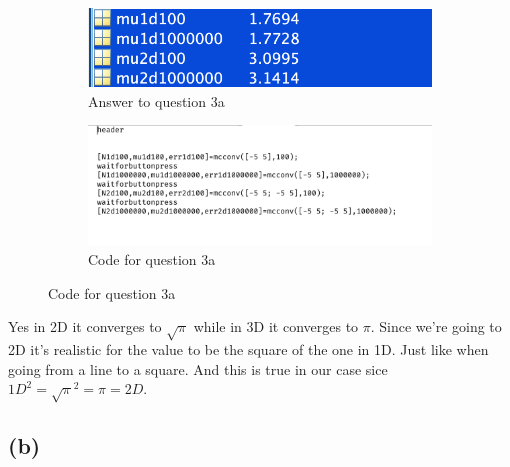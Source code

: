 \documentclass{article}
\begin{document}
\begin{figure}[H]
    \begin{subfigure}[h]{0.45\linewidth}
        \includegraphics[width=\linewidth]{imgs/q3a_results.png}
        \caption{Answer to question 3a}
    \end{subfigure}
    \hfill
    \begin{subfigure}[h]{0.45\linewidth}
        \includegraphics[width=\linewidth]{imgs/q3a_code.png}
        \caption{Code for question 3a}
    \end{subfigure}
\end{figure}
Yes in 2D it converges to \( \sqrt{\pi} \) while in 3D it converges to \( \pi \). Since
we're going to 2D it's realistic for the value to be the square of the one in 1D. 
Just like when going from a line to a square. And this is true in our case sice \( 1D^2=\sqrt{\pi}^2=\pi=2D \).
\subsection{(b)}
\end{document}
